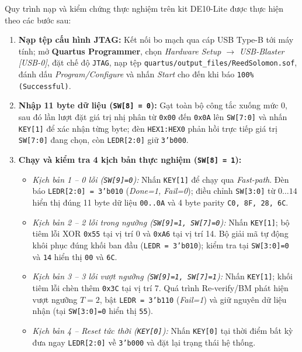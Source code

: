 \documentclass[11pt,a4paper]{report}
\begin{document}
Quy trình nạp và kiểm chứng thực nghiệm trên kit DE10-Lite được thực hiện theo các bước sau:
\begin{enumerate}
    \item \textbf{Nạp tệp cấu hình JTAG:} Kết nối bo mạch qua cáp USB Type-B tới máy tính; mở \textbf{Quartus Programmer}, chọn \textit{Hardware Setup $\rightarrow$ USB-Blaster [USB-0]}, đặt chế độ \texttt{JTAG}, nạp tệp \texttt{quartus/output\_files/ReedSolomon.sof}, đánh dấu \textit{Program/Configure} và nhấn \textit{Start} cho đến khi báo \texttt{100\% (Successful)}.
    \item \textbf{Nhập 11 byte dữ liệu (\texttt{SW[8] = 0}):} Gạt toàn bộ công tắc xuống mức 0, sau đó lần lượt đặt giá trị nhị phân từ \texttt{0x00} đến \texttt{0x0A} lên \texttt{SW[7:0]} và nhấn \texttt{KEY[1]} để xác nhận từng byte; đèn \texttt{HEX1:HEX0} phản hồi trực tiếp giá trị \texttt{SW[7:0]} đang chọn, còn \texttt{LEDR[2:0]} giữ \texttt{3'b000}.
    \item \textbf{Chạy và kiểm tra 4 kịch bản thực nghiệm (\texttt{SW[8] = 1}):}
    \begin{itemize}
        \item \textit{Kịch bản 1 -- 0 lỗi (\texttt{SW[9]=0}):} Nhấn \texttt{KEY[1]} để chạy qua \textit{Fast-path}. Đèn báo \texttt{LEDR[2:0] = 3'b010} (\textit{Done=1, Fail=0}); điều chỉnh \texttt{SW[3:0]} từ $0\dots 14$ hiển thị đúng 11 byte dữ liệu \texttt{00..0A} và 4 byte parity \texttt{C0, 8F, 28, 6C}.
        \item \textit{Kịch bản 2 -- 2 lỗi trong ngưỡng (\texttt{SW[9]=1, SW[7]=0}):} Nhấn \texttt{KEY[1]}; bộ tiêm lỗi XOR \texttt{0x55} tại vị trí 0 và \texttt{0xA6} tại vị trí 14. Bộ giải mã tự động khôi phục đúng khối ban đầu (\texttt{LEDR = 3'b010}); kiểm tra tại \texttt{SW[3:0]=0} và \texttt{14} hiển thị \texttt{00} và \texttt{6C}.
        \item \textit{Kịch bản 3 -- 3 lỗi vượt ngưỡng (\texttt{SW[9]=1, SW[7]=1}):} Nhấn \texttt{KEY[1]}; khối tiêm lỗi chèn thêm \texttt{0x3C} tại vị trí 7. Quá trình Re-verify/BM phát hiện vượt ngưỡng $T=2$, bật \texttt{LEDR = 3'b110} (\textit{Fail=1}) và giữ nguyên dữ liệu nhận (tại \texttt{SW[3:0]=0} hiển thị \texttt{55}).
        \item \textit{Kịch bản 4 -- Reset tức thời (\texttt{KEY[0]}):} Nhấn \texttt{KEY[0]} tại thời điểm bất kỳ đưa ngay \texttt{LEDR[2:0]} về \texttt{3'b000} và đặt lại trạng thái hệ thống.
    \end{itemize}
\end{enumerate}
\end{document}
